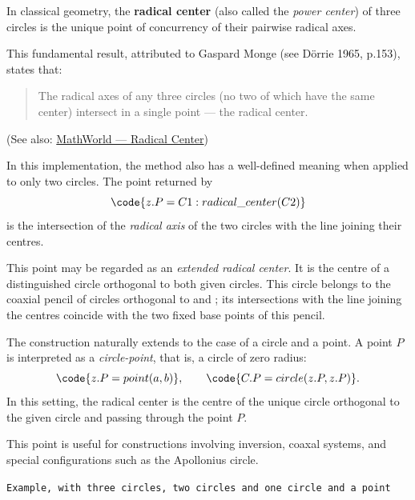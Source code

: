 In classical geometry, the \textbf{radical center} (also called the \emph{power center}) of three circles is the unique point of concurrency of their pairwise radical axes.

\medskip

This fundamental result, attributed to Gaspard Monge (see Dörrie 1965, p.153), states that:
\begin{quote}
The radical axes of any three circles (no two of which have the same center) intersect in a single point — the radical center.
\end{quote}


(See also: \href{https://mathworld.wolfram.com/RadicalCenter.html}{MathWorld — Radical Center})

\medskip

In this implementation, the method  also has a
well-defined meaning when applied to only two circles.
The point returned by
\[
\code{z.P = C1:radical\_center(C2)}
\]
is the intersection of the \emph{radical axis} of the two circles with the line
joining their centres.

This point may be regarded as an \emph{extended radical center}.
It is the centre of a distinguished circle orthogonal to both given circles.
This circle belongs to the coaxial pencil of circles orthogonal to
 and ; its intersections with the line joining the centres
coincide with the two fixed base points of this pencil.

The construction naturally extends to the case of a circle and a point.
A point $P$ is interpreted as a \emph{circle-point}, that is, a circle of zero
radius:
\[
\code{z.P = point(a,b)}, \qquad \code{C.P = circle(z.P,z.P)}.
\]
In this setting, the radical center is the centre of the unique circle
orthogonal to the given circle and passing through the point $P$.


\medskip

This point is useful for constructions involving inversion, coaxal systems, and special configurations such as the Apollonius circle.

\texttt{Example, with three circles, two circles and one circle and a point}

